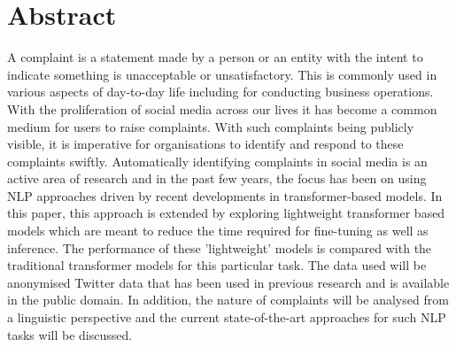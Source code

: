 \chapter*{\Large \center Abstract}

A complaint is a statement made by a person or an entity with the intent to indicate something is unacceptable or unsatisfactory. This is commonly used in various aspects of day-to-day life including for conducting business operations. With the proliferation of social media across our lives it has become a common medium for users to raise complaints. With such complaints being publicly visible, it is imperative for organisations to identify and respond to these complaints swiftly. 
Automatically identifying complaints in social media is an active area of research and in the past few years, the focus has been on using NLP approaches driven by recent developments in transformer-based models. \newline\newline
In this paper, this approach is extended by exploring lightweight transformer based models which are meant to reduce the time required for fine-tuning as well as inference.  The performance of these 'lightweight' models is compared with the traditional transformer models for this particular task. The data used will be anonymised Twitter data that has been used in previous research and is available in the public domain. In addition, the nature of complaints will be analysed from a linguistic perspective and the current state-of-the-art approaches for such NLP tasks will be discussed.